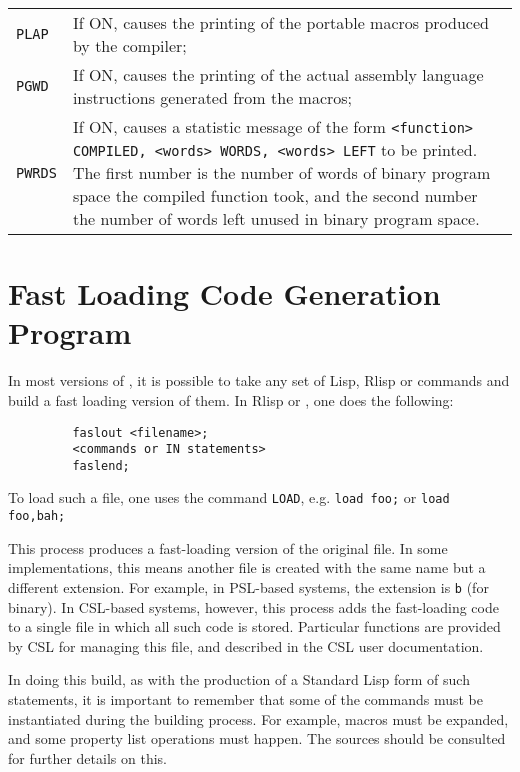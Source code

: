 {\renewcommand{\arraystretch}{2}
\begin{tabular}{lp{\reduceboxwidth}}
{\tt PLAP} & If ON, causes the printing of the
portable macros produced by the compiler; \\
%
{\tt PGWD} & If ON, causes the printing of the
actual assembly language instructions generated from the macros; \\
%
{\tt PWRDS} & If ON, causes a statistic
message of the form \newline
{\tt    <function> COMPILED, <words> WORDS, <words> LEFT} \newline
to be printed.  The first number is the number of words of binary
program space the compiled function took, and the second number
the number of words left unused in binary program space. \\
\end{tabular}}

\section{Fast Loading Code Generation Program}
\label{sec-load}
In most versions of {\REDUCE}, it is possible to take any set of Lisp, Rlisp
or {\REDUCE} commands and build a fast loading version of them. In Rlisp or
{\REDUCE}, one does the following:
\begin{verbatim}
         faslout <filename>;
         <commands or IN statements>
         faslend;
\end{verbatim}
To load such a file, one uses the command {\tt LOAD},
e.g. {\tt load foo;}
or {\tt load foo,bah;}

This process produces a fast-loading version of the original file.  In some
implementations, this means another file is created with the same name but
a different extension. For example, in PSL-based systems, the extension is
{\tt b} (for binary). In CSL-based systems, however, this process adds the
fast-loading code to a single file in which all such code is stored.
Particular functions are provided by CSL for managing this file, and
described in the CSL user documentation.

In doing this build, as with the production of a Standard Lisp form of
such statements, it is important to remember that some of the commands
must be instantiated during the building process.  For example, macros
must be expanded, and some property list operations must happen.
The {\REDUCE} sources should be consulted for further details on this.

